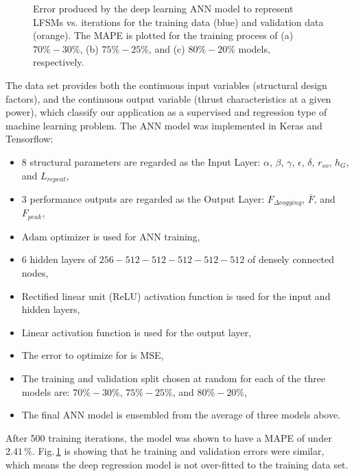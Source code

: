 \begin{figure}
{                    \label{fig:chapter/rsm/LFSM/training result/MAPE_80_20}
                }
                \caption{
                    Error produced by the deep learning ANN model to represent \acsp{LFSM} vs. iterations for the training data (blue) and validation data (orange). The \acs{MAPE} is plotted for the training process of (a) $70\%-30\%$, (b) $75\%-25\%$, and (c) $80\%-20\%$ models, respectively.
                }   \label{fig:chapter/rsm/LFSM/training result}
            \end{figure}
        
        
            The data set provides both the continuous input variables (structural design factors), and the continuous output variable (thrust characteristics at a given power), which classify our application as a supervised and regression type of machine learning problem. The ANN model was implemented in Keras and Tensorflow:

            
            \begin{itemize}
                \item $8$ structural parameters are regarded as the Input Layer: $\alpha$, $\beta$, $\gamma$, $\epsilon$, $\delta$, $r_{so}$, $h_G$, and $L_{repeat}$,
                \item $3$ performance outputs are regarded as the Output Layer: $F_{\Delta cogging}$, $\overline{F}$, and $F_{peak}$,
                \item $\mathrm{Adam}$ optimizer is used for \acs{ANN} training,
                \item $6$ hidden layers of $256-512-512-512-512-512$ of densely connected nodes,
                \item Rectified linear unit (ReLU) activation function is used
for the input and hidden layers,
                \item Linear activation function is used for the output layer,
                \item The error to optimize for is \acs{MSE},
                \item The training and validation split chosen at random for each of the three models are: $70\%-30\%$, $75\%-25\%$, and $80\%-20\%$,
                \item The final \acs{ANN} model is ensembled from the average of three models above.
            \end{itemize}


            After 500 training iterations, the model was shown to have a \acf{MAPE} of under $2.41\,\%$. Fig.\,\ref{fig:chapter/rsm/LFSM/training result} is showing that he training and validation errors were similar, which means the deep regression model is not over-fitted to the training data set.
        

